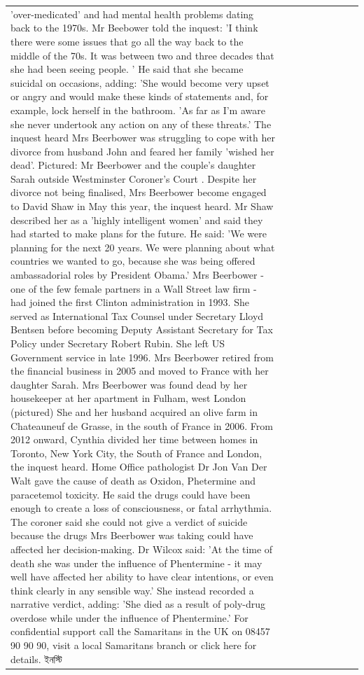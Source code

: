 \begin{table}[H]
\begin{tabular}{lllrlllll}
'over-medicated' and had mental health problems dating back to the 1970s. Mr Beebower told the inquest: 'I think there were some issues that go all the way back to the middle of the 70s. It was between two and three decades that she had been seeing people. ' He said that she became suicidal on occasions, adding: 'She would become very upset or angry and would make these kinds of statements and, for example, lock herself in the bathroom. 'As far as I'm aware she never undertook any action on any of these threats.' The inquest heard Mrs Beerbower was struggling to cope with her divorce from husband John and feared her family 'wished her dead'. Pictured: Mr Beerbower and the couple's daughter Sarah outside Westminster Coroner's Court . Despite her divorce not being finalised, Mrs Beerbower become engaged to David Shaw in May this year, the inquest heard. Mr Shaw described her as a 'highly intelligent women' and said they had started to make plans for the future. He said: 'We were planning for the next 20 years. We were planning about what countries we wanted to go, because she was being offered ambassadorial roles by President Obama.' Mrs Beerbower - one of the few female partners in a Wall Street law firm - had joined the first Clinton administration in 1993. She served as International Tax Counsel under Secretary Lloyd Bentsen before becoming Deputy Assistant Secretary for Tax Policy under Secretary Robert Rubin. She left US Government service in late 1996. Mrs Beerbower retired from the financial business in 2005 and moved to France with her daughter Sarah. Mrs Beerbower was found dead by her housekeeper at her apartment in Fulham, west London (pictured) She and her husband acquired an olive farm in Chateauneuf de Grasse, in the south of France in 2006. From 2012 onward, Cynthia divided her time between homes in Toronto, New York City, the South of France and London, the inquest heard. Home Office pathologist Dr Jon Van Der Walt gave the cause of death as Oxidon, Phetermine and paracetemol toxicity. He said the drugs could have been enough to create a loss of consciousness, or fatal arrhythmia. The coroner said she could not give a verdict of suicide because the drugs Mrs Beerbower was taking could have affected her decision-making. Dr Wilcox said: 'At the time of death she was under the influence of Phentermine - it may well have affected her ability to have clear intentions, or even think clearly in any sensible way.' She instead recorded a narrative verdict, adding: 'She died as a result of poly-drug overdose while under the influence of Phentermine.' For confidential support call the Samaritans in the UK on 08457 90 90 90, visit a local Samaritans branch or click here for details. ইনস্টি \\

\end{tabular}
\end{table}

